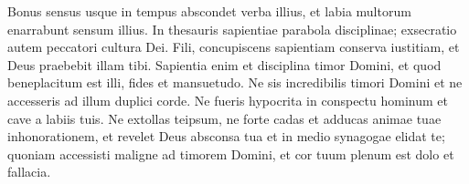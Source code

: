 \begin{biblechapter}
\verse Bonus sensus usque in tempus abscondet verba illius, et labia multorum enarrabunt sensum illius. 
\verse In thesauris sapientiae parabola disciplinae; 
\verse exsecratio autem peccatori cultura Dei. 
\verse Fili, concupiscens sapientiam conserva iustitiam, et Deus praebebit illam tibi. 
\verse Sapientia enim et disciplina timor Domini, et quod beneplacitum est illi, 
\verse fides et mansuetudo. 
\verse Ne sis incredibilis timori Domini et ne accesseris ad illum duplici corde. 
\verse Ne fueris hypocrita in conspectu hominum et cave a labiis tuis. 
\verse Ne extollas teipsum, ne forte cadas et adducas animae tuae inhonorationem, 
\verse et revelet Deus absconsa tua et in medio synagogae elidat te; 
\verse quoniam accessisti maligne ad timorem Domini, et cor tuum plenum est dolo et fallacia. 
\end{biblechapter}

